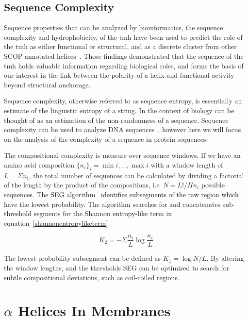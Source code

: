 \subsection{Sequence Complexity}

Sequence properties that can be analyzed by bioinformatics, the sequence complexity and hydrophobicity, of the \gls{tmh} have been used to predict the role of the \gls{tmh} as either functional or structural, and as a discrete cluster from other SCOP annotated helices~\cite{Wong2012}. Those findings demonstrated that the sequence of the \gls{tmh} holds valuable information regarding biological roles, and forms the basis of our interest in the link between the polarity of a helix and functional activity beyond structural anchorage.

Sequence complexity, otherwise referred to as sequence entropy, is essentially an estimate of the linguistic entropy of a string. In the context of biology can be thought of as an estimation of the non-randomness of a sequence. Sequence complexity can be used to analyze DNA sequences~\cite{Pinho2013, Oliver1993, Troyanskaya2002}, however here we will focus on the analysis of the complexity of a sequence in protein sequences.

The compositional complexity is measure over sequence windows. If we have an amino acid composition $\{{{n}_{i}}{\}}_{i}={\min{i}},\ldots,{\max{i}}$ with a window length of $L=\Sigma {n}_i $, the total number of sequences can be calculated by dividing a factorial of the length by the product of the compositions, i.e\  $ N = L!/\Pi{n}_i $ possible sequences. The SEG algorithm~\cite{WOOTTON1994269, Wootton1996} identifies subsegments of the raw region which have the lowest probability. The algorithm searches for and concatenates sub-threshold segments for the Shannon entropy-like term in equation~\ref{shannonentropyliketerm}

\begin{equation} \label{shannonentropyliketerm}
{K}_{2}=-\Sigma\frac{n_i}{L}\log\frac{n_i}{L}
\end{equation}

The lowest probability subsegment can be defined as $ K_1=\log N/L $. By altering the window lengths, and the thresholds SEG can be optimized to search for subtle compositional deviations, such as coil-coiled regions.

\section{$\alpha$ Helices In Membranes }


